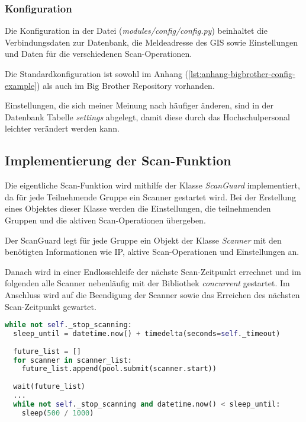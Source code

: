 \subsubsection{Konfiguration}

Die Konfiguration in der Datei (\textit{modules/config/config.py}) beinhaltet die Verbindungsdaten zur Datenbank, die Meldeadresse des GIS sowie Einstellungen und Daten für die verschiedenen Scan-Operationen.

Die Standardkonfiguration ist sowohl im Anhang (\ref{lst:anhang-bigbrother-config-example}) als auch im Big Brother Repository vorhanden.

Einstellungen, die sich meiner Meinung nach häufiger änderen, sind in der Datenbank Tabelle \textit{settings} abgelegt, damit diese durch das Hochschulpersonal leichter verändert werden kann.

\subsection{Implementierung der Scan-Funktion}

Die eigentliche Scan-Funktion wird mithilfe der Klasse \textit{ScanGuard} implementiert, da für jede Teilnehmende Gruppe ein Scanner gestartet wird. Bei der Erstellung eines Objektes dieser Klasse werden die Einstellungen, die teilnehmenden Gruppen und die aktiven Scan-Operationen übergeben.

Der ScanGuard legt für jede Gruppe ein Objekt der Klasse \textit{Scanner} mit den benötigten Informationen wie IP, aktive Scan-Operationen und Einstellungen an.

Danach wird in einer Endlosschleife der nächste Scan-Zeitpunkt errechnet und im folgenden alle Scanner nebenläufig mit der Bibliothek \textit{concurrent} gestartet. Im Anschluss wird auf die Beendigung der Scanner sowie das Erreichen des nächsten Scan-Zeitpunkt gewartet.

\begin{lstlisting}[language=Python, frame=single, caption={Big Brother ScanGaurd}, captionpos=b, label={lst:bigbrother-scanguard}]
while not self._stop_scanning:
  sleep_until = datetime.now() + timedelta(seconds=self._timeout)
  
  future_list = []
  for scanner in scanner_list:
    future_list.append(pool.submit(scanner.start))
    
  wait(future_list)
  ...
  while not self._stop_scanning and datetime.now() < sleep_until:
    sleep(500 / 1000)
\end{lstlisting}

